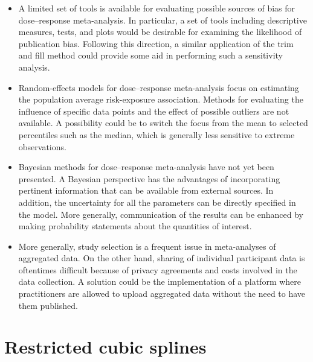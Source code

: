 \documentclass[11pt,a4paper,twoside,openany]{book}\usepackage{knitr}
\begin{document}
{{\begin{itemize}
\item A limited set of tools is available for evaluating possible sources of bias for dose--response meta-analysis. In particular, a set of tools including descriptive measures, tests, and plots would be desirable for examining the likelihood of publication bias. Following this direction, a similar application of the trim and fill method could provide some aid in performing such a sensitivity analysis.

\item Random-effects models for dose--response meta-analysis focus on estimating the population average risk-exposure association. Methods for evaluating the influence of specific data points and the effect of possible outliers are not available. A possibility could be to switch the focus from the mean to selected percentiles such as the median, which is generally less sensitive to extreme observations.

\item Bayesian methods for dose--response meta-analysis have not yet been presented. A Bayesian perspective has the advantages of incorporating pertinent information that can be available from external sources. In addition, the uncertainty for all the parameters can be directly specified in the model. More generally, communication of the results can be enhanced by making probability statements about the quantities of interest.

\item More generally, study selection is a frequent issue in meta-analyses of aggregated data. On the other hand, sharing of individual participant data is oftentimes difficult because of privacy agreements and costs involved in the data collection. A solution could be the implementation of a platform where practitioners are allowed to upload aggregated data without the need to have them published.

\end{itemize}

\appendix


%

\chapter{Restricted cubic splines}\label{sec:rcs}

}}
\end{document}
